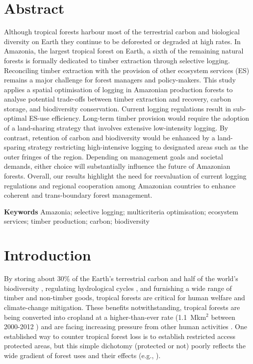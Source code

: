 \documentclass[12pt]{article}
\begin{document}
\section*{Abstract}

Although tropical forests harbour most of the terrestrial carbon and biological diversity on Earth they continue to be deforested or degraded at high rates. In Amazonia, the largest tropical forest on Earth, a sixth of the remaining natural forests is formally dedicated to timber extraction through selective logging. Reconciling timber extraction with the provision of other ecosystem services (ES) remains a major challenge for forest managers and policy-makers. This study applies a spatial optimisation of logging in Amazonian production forests to analyse potential trade-offs between timber extraction and recovery, carbon storage, and biodiversity conservation. Current logging regulations result in sub-optimal ES-use efficiency. Long-term timber provision would require the adoption of a land-sharing strategy that involves extensive low-intensity logging. By contrast, retention of carbon and biodiversity would be enhanced by a land-sparing strategy restricting high-intensive logging to designated areas such as the outer fringes of the region. Depending on management goals and societal demands, either choice will substantially influence the future of Amazonian forests. Overall, our results highlight the need for reevaluation of current logging regulations and regional cooperation among Amazonian countries to enhance coherent and trans-boundary forest management.

\vspace{1cm}
\textbf{Keywords} Amazonia; selective logging; multicriteria optimisation; ecosystem services; timber production; carbon; biodiversity


\section*{Introduction}

By storing about 30\% of the Earth’s terrestrial carbon \cite{Pan2013} and half of the world’s biodiversity \cite{Pimm2014}, regulating hydrological cycles \cite{Fisher2009a}, and furnishing a wide range of timber and non-timber goods, tropical forests are critical for human welfare and climate-change mitigation. These benefits notwithstanding, tropical forests are being converted into cropland at a higher-than-ever rate (1.1~Mkm$^2$ between 2000-2012 \cite{Hansen2013}) and are facing increasing pressure from other human activities \cite{Lewis2015}. One established way to counter tropical forest loss is to establish restricted access protected areas, but this simple dichotomy (protected or not) poorly reflects the wide gradient of forest uses and their effects (e.g., \cite{DeCastroSolar2015,Gibson2011}). 
\end{document}

